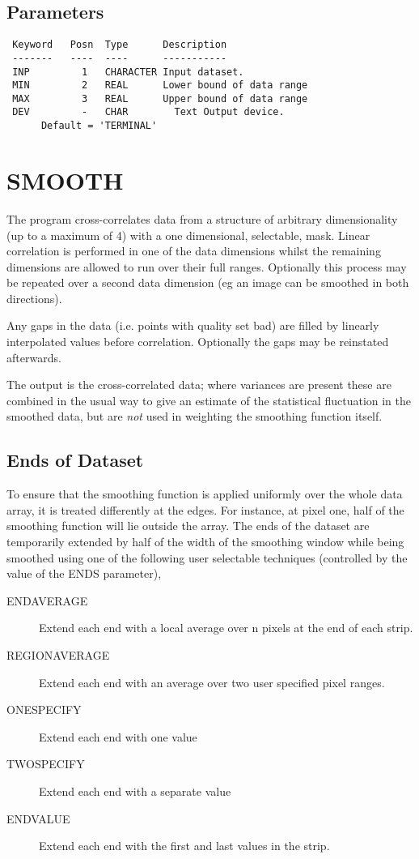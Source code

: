 \documentclass{book}
\renewcommand{\_}{{\tt\char'137}}     %
\begin{document}
\subsection{Parameters}
\begin{verbatim}
 Keyword   Posn  Type      Description
 -------   ----  ----      -----------
 INP         1   CHARACTER Input dataset.
 MIN         2   REAL      Lower bound of data range
 MAX         3   REAL      Upper bound of data range
 DEV         -   CHAR        Text Output device.
      Default = 'TERMINAL'

\end{verbatim}\section{SMOOTH}
The program cross-correlates data from a structure of arbitrary
dimensionality (up to a maximum of 4) with a one dimensional,
selectable, mask. Linear correlation is performed in one of the
data dimensions whilst the remaining dimensions are allowed to
run over their full ranges. Optionally this process may be
repeated over a second data dimension (eg an image can be
smoothed in both directions).

Any gaps in the data (i.e. points with quality set bad) are
filled by linearly interpolated values before correlation.
Optionally the gaps may be reinstated afterwards.

The output is the cross-correlated data; where variances are
present these are combined in the usual way to give an estimate
of the statistical fluctuation in the smoothed data, but are
{\em not} used in weighting the smoothing function itself.

\subsection{Ends of Dataset}
To ensure that the smoothing function is applied uniformly over
the whole data array, it is treated differently at the edges.
For instance, at pixel one, half of the smoothing function will
lie outside the array. The ends of the dataset are temporarily
extended by half of the width of the smoothing window while
being smoothed using one of the following user selectable
techniques (controlled by the value of the ENDS parameter),

\begin{description}
\item[ENDAVERAGE]
Extend each end with a local average over n pixels at
the end of each strip.
\item[REGIONAVERAGE]
Extend each end with an average over two user specified
pixel ranges.
\item[ONESPECIFY]
Extend each end with one value
\item[TWOSPECIFY]
Extend each end with a separate value
\item[ENDVALUE]
Extend each end with the first and last values in the
strip.
\end{description}
\end{document}
